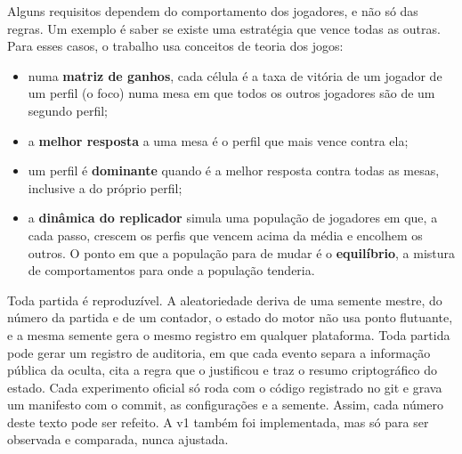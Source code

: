
Alguns requisitos dependem do comportamento dos jogadores, e não só das regras. Um exemplo é saber se existe
uma estratégia que vence todas as outras. Para esses casos, o trabalho usa conceitos de teoria dos jogos:
\begin{itemize}
  \item numa \textbf{matriz de ganhos}, cada célula é a taxa de vitória de um jogador de um perfil (o foco) numa
    mesa em que todos os outros jogadores são de um segundo perfil;
  \item a \textbf{melhor resposta} a uma mesa é o perfil que mais vence contra ela;
  \item um perfil é \textbf{dominante} quando é a melhor resposta contra todas as mesas, inclusive a do próprio
    perfil;
  \item a \textbf{dinâmica do replicador} \cite{taylor1978} simula uma população de jogadores em que, a cada
    passo, crescem os perfis que vencem acima da média e encolhem os outros. O ponto em que a população para de
    mudar é o \textbf{equilíbrio}, a mistura de comportamentos para onde a população tenderia. 
\end{itemize}

Toda partida é reproduzível. A aleatoriedade deriva de uma semente mestre, do número da partida e de um
contador, o estado do motor não usa ponto flutuante, e a mesma semente gera o mesmo registro em qualquer
plataforma. Toda partida pode gerar um registro de auditoria, em que cada evento separa a informação pública da
oculta, cita a regra que o justificou e traz o resumo criptográfico do estado. Cada experimento oficial só roda
com o código registrado no git e grava um manifesto com o commit, as configurações e a semente. Assim, cada
número deste texto pode ser refeito. A v1 também foi implementada, mas só para ser observada e comparada, nunca
ajustada.

